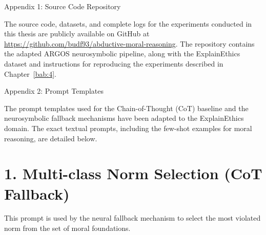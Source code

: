 \begin{flushright}
	Appendix 1: Source Code Repository
\end{flushright}
\label{appendix:source_code}

The source code, datasets, and complete logs for the experiments conducted in this thesis are publicly available on GitHub at \url{https://github.com/budf93/abductive-moral-reasoning}. 
The repository contains the adapted ARGOS neurosymbolic pipeline, along with the ExplainEthics dataset and instructions for reproducing the experiments described in Chapter~\ref{bab:4}.

\begin{flushright}
	Appendix 2: Prompt Templates
\end{flushright}
\label{appendix:prompts}

The prompt templates used for the Chain-of-Thought (CoT) baseline and the neurosymbolic fallback mechanisms have been adapted to the ExplainEthics domain. The exact textual prompts, including the few-shot examples for moral reasoning, are detailed below.

\section*{1. Multi-class Norm Selection (CoT Fallback)}
This prompt is used by the neural fallback mechanism to select the most violated norm from the set of moral foundations.


